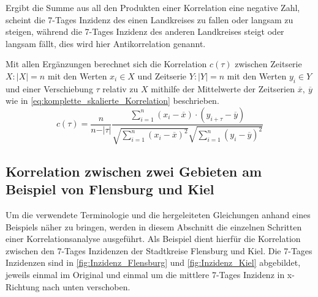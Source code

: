 Ergibt die Summe aus all den Produkten einer Korrelation eine negative Zahl, scheint die 7-Tages Inzidenz des einen Landkreises zu fallen oder langsam zu steigen, während die 7-Tages Inzidenz des anderen Landkreises steigt oder langsam fällt, dies wird hier Antikorrelation genannt.

Mit allen Ergänzungen berechnet sich die Korrelation $c(\tau)$ zwischen Zeitserie $X:|X|=n$ mit den Werten $x_i\in X$ und Zeitserie $Y:|Y|=n$ mit den Werten $y_i \in Y$ und einer Verschiebung $\tau$ relativ zu $X$ mithilfe der Mittelwerte der Zeitserien $\overline x,\ \overline y$ wie in \autoref{eq:komplette_skalierte_Korrelation} beschrieben.
\begin{equation}\label{eq:komplette_skalierte_Korrelation}
    c(\tau) =\frac{n}{n-\vert\tau\vert}
    \frac{\sum_{i=1}^n (x_i-\overline x)\cdot (y_{i+\tau}-\overline y)}{\sqrt{\sum_{i=1}^n (x_i-\overline x)^2}\sqrt{\sum_{i=1}^n (y_i-\overline y)^2}}
\end{equation}

\subsection{Korrelation zwischen zwei Gebieten am Beispiel von Flensburg und Kiel}
Um die verwendete Terminologie und die hergeleiteten Gleichungen anhand eines Beispiels näher zu bringen, werden in diesem Abschnitt die einzelnen Schritten einer Korrelationsanalyse ausgeführt. Als Beispiel dient hierfür die Korrelation zwischen den 7-Tages Inzidenzen der Stadtkreise Flensburg und Kiel. Die 7-Tages Inzidenzen sind in \autoref{fig:Inzidenz_Flensburg} und \autoref{fig:Inzidenz_Kiel} abgebildet, jeweils einmal im Original und einmal um die mittlere 7-Tages Inzidenz in x-Richtung nach unten verschoben.

